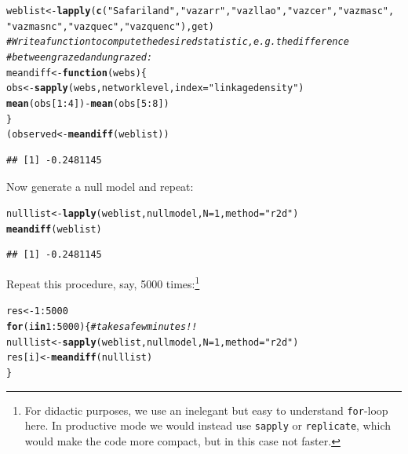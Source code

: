 \documentclass[a4paper, 11pt]{article}\usepackage[]{graphicx}\usepackage[dvipsnames]{xcolor}
\makeatletter
\newcommand{\hlnum}[1]{\textcolor[rgb]{0.686,0.059,0.569}{#1}}%
\newcommand{\hlstr}[1]{\textcolor[rgb]{0.192,0.494,0.8}{#1}}%
\newcommand{\hlcom}[1]{\textcolor[rgb]{0.678,0.584,0.686}{\textit{#1}}}%
\newcommand{\hlopt}[1]{\textcolor[rgb]{0,0,0}{#1}}%
\newcommand{\hlstd}[1]{\textcolor[rgb]{0.345,0.345,0.345}{#1}}%
\newcommand{\hlkwa}[1]{\textcolor[rgb]{0.161,0.373,0.58}{\textbf{#1}}}%
\newcommand{\hlkwb}[1]{\textcolor[rgb]{0.69,0.353,0.396}{#1}}%
\newcommand{\hlkwc}[1]{\textcolor[rgb]{0.333,0.667,0.333}{#1}}%
\newcommand{\hlkwd}[1]{\textcolor[rgb]{0.737,0.353,0.396}{\textbf{#1}}}%
\newenvironment{kframe}{%
 \def\at@end@of@kframe{}%
 \ifinner\ifhmode%
  \def\at@end@of@kframe{\end{minipage}}%
  \begin{minipage}{\columnwidth}%
 \fi\fi%
 \def\FrameCommand##1{\hskip\@totalleftmargin \hskip-\fboxsep
 \colorbox{shadecolor}{##1}\hskip-\fboxsep
     \hskip-\linewidth \hskip-\@totalleftmargin \hskip\columnwidth}%
 \MakeFramed {\advance\hsize-\width
   \@totalleftmargin\z@ \linewidth\hsize
   \@setminipage}}%
 {\par\unskip\endMakeFramed%
 \at@end@of@kframe}
\newenvironment{knitrout}{}{} %
\makeatother
\begin{document}
\begin{knitrout}
\color{fgcolor}\begin{kframe}
\begin{alltt}
\hlstd{weblist} \hlkwb{<-} \hlkwd{lapply}\hlstd{(}\hlkwd{c}\hlstd{(}\hlstr{"Safariland"}\hlstd{,} \hlstr{"vazarr"}\hlstd{,} \hlstr{"vazllao"}\hlstd{,} \hlstr{"vazcer"}\hlstd{,} \hlstr{"vazmasc"}\hlstd{,}
                       \hlstr{"vazmasnc"}\hlstd{,} \hlstr{"vazquec"}\hlstd{,} \hlstr{"vazquenc"}\hlstd{), get)}
\hlcom{# Write a function to compute the desired statistic, e.g. the difference }
\hlcom{# between grazed and ungrazed:}
\hlstd{meandiff} \hlkwb{<-} \hlkwa{function}\hlstd{(}\hlkwc{webs}\hlstd{)\{}
   \hlstd{obs} \hlkwb{<-} \hlkwd{sapply}\hlstd{(webs, networklevel,} \hlkwc{index}\hlstd{=}\hlstr{"linkage density"}\hlstd{)}
   \hlkwd{mean}\hlstd{(obs[}\hlnum{1}\hlopt{:}\hlnum{4}\hlstd{])} \hlopt{-} \hlkwd{mean}\hlstd{(obs[}\hlnum{5}\hlopt{:}\hlnum{8}\hlstd{])}
\hlstd{\}}
\hlstd{(observed} \hlkwb{<-} \hlkwd{meandiff}\hlstd{(weblist))}
\end{alltt}
\begin{verbatim}
## [1] -0.2481145
\end{verbatim}
\end{kframe}
\end{knitrout}
Now generate a null model and repeat:
\begin{knitrout}
\color{fgcolor}\begin{kframe}
\begin{alltt}
\hlstd{nulllist} \hlkwb{<-} \hlkwd{lapply}\hlstd{(weblist, nullmodel,} \hlkwc{N}\hlstd{=}\hlnum{1}\hlstd{,} \hlkwc{method}\hlstd{=}\hlstr{"r2d"}\hlstd{)}
\hlkwd{meandiff}\hlstd{(weblist)}
\end{alltt}
\begin{verbatim}
## [1] -0.2481145
\end{verbatim}
\end{kframe}
\end{knitrout}
Repeat this procedure, say, 5000 times:\footnote{For didactic purposes, we use an inelegant but easy to understand \texttt{for}-loop here. In productive mode we would instead use \texttt{sapply} or \texttt{replicate}, which would make the code more compact, but in this case not faster.}
\begin{knitrout}
\color{fgcolor}\begin{kframe}
\begin{alltt}
\hlstd{res} \hlkwb{<-} \hlnum{1}\hlopt{:}\hlnum{5000}
\hlkwa{for} \hlstd{(i} \hlkwa{in} \hlnum{1}\hlopt{:}\hlnum{5000}\hlstd{)\{} \hlcom{# takes a few minutes !!}
   \hlstd{nulllist} \hlkwb{<-} \hlkwd{sapply}\hlstd{(weblist, nullmodel,} \hlkwc{N}\hlstd{=}\hlnum{1}\hlstd{,} \hlkwc{method}\hlstd{=}\hlstr{"r2d"}\hlstd{)}
   \hlstd{res[i]} \hlkwb{<-} \hlkwd{meandiff}\hlstd{(nulllist)}
\hlstd{\}}
\end{alltt}
\end{kframe}
\end{knitrout}
\end{document}
